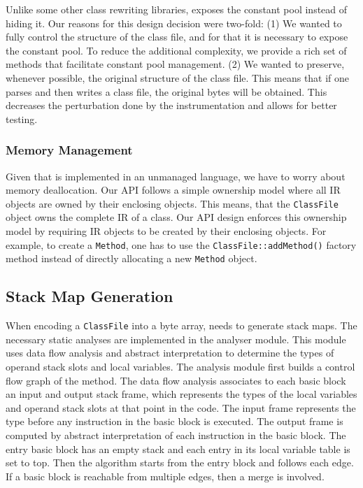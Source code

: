 Unlike some other class rewriting libraries, \jnif{} exposes the constant pool instead of hiding it.
Our reasons for this design decision were two-fold:
(1) We wanted to fully control the structure of the class file, 
and for that it is necessary to expose the constant pool. 
To reduce the additional complexity, we provide a rich set of methods that facilitate constant pool management. 
(2) We wanted to preserve, whenever possible, the original structure of the class file. 
This means that if one parses and then writes a class file, 
the original bytes will be obtained. 
This decreases the perturbation done by the instrumentation and allows for better testing.


\subsubsection*{Memory Management}

Given that \jnif{} is implemented in an unmanaged language,
we have to worry about memory deallocation.
Our API follows a simple ownership model
where all IR objects are owned by their enclosing objects.
This means, that the \texttt{ClassFile} object owns the complete IR of a class.
Our API design enforces this ownership model
by requiring IR objects to be created by their enclosing objects.
For example, to create a \texttt{Method}, 
one has to use the \texttt{ClassFile::addMethod()} factory method
instead of directly allocating a new \texttt{Method} object.


\subsection*{Stack Map Generation}

When encoding a \texttt{ClassFile} into a byte array, \jnif{} needs to generate stack maps.
The necessary static analyses are implemented in the analyser module.
This module uses data flow analysis and abstract interpretation to determine the types of operand stack slots and local variables.
The analysis module first builds a control flow graph of the method.
The data flow analysis associates to each basic block an input and output stack frame, 
which represents the types of the local variables and operand stack slots at that point in the code.
The input frame represents the type before any instruction in the basic block is executed.
The output frame is computed by abstract interpretation of each instruction in the basic block.
The entry basic block has an empty stack and each entry in its local variable table is set to top.
Then the algorithm starts from the entry block and follows each edge.
If a basic block is reachable from multiple edges, then a merge is involved.

